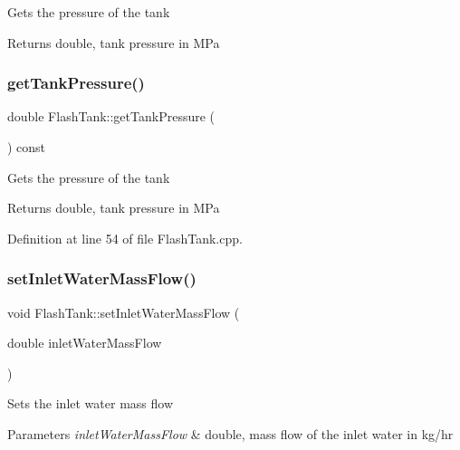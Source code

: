 Gets the pressure of the tank \begin{DoxyReturn}{Returns}
double, tank pressure in M\+Pa 
\end{DoxyReturn}
\mbox{\label{class_flash_tank_af5d4f0bf7babe61120e1e4452594e1af}} 
\subsubsection{\texorpdfstring{get\+Tank\+Pressure()}{getTankPressure()}\hspace{0.1cm}{\footnotesize\ttfamily [3/3]}}
{\footnotesize\ttfamily double Flash\+Tank\+::get\+Tank\+Pressure (\begin{DoxyParamCaption}{ }\end{DoxyParamCaption}) const}

Gets the pressure of the tank \begin{DoxyReturn}{Returns}
double, tank pressure in M\+Pa 
\end{DoxyReturn}


Definition at line 54 of file Flash\+Tank.\+cpp.

\mbox{\label{class_flash_tank_a2bcbd92d39ef3c760bdd65066ba3d34a}} 
\subsubsection{\texorpdfstring{set\+Inlet\+Water\+Mass\+Flow()}{setInletWaterMassFlow()}\hspace{0.1cm}{\footnotesize\ttfamily [1/3]}}
{\footnotesize\ttfamily void Flash\+Tank\+::set\+Inlet\+Water\+Mass\+Flow (\begin{DoxyParamCaption}\item[{double}]{inlet\+Water\+Mass\+Flow }\end{DoxyParamCaption})}

Sets the inlet water mass flow 
\begin{DoxyParams}{Parameters}
{\em inlet\+Water\+Mass\+Flow} & double, mass flow of the inlet water in kg/hr \\
\hline
\end{DoxyParams}
\mbox{\label{class_flash_tank_a2bcbd92d39ef3c760bdd65066ba3d34a}} 
